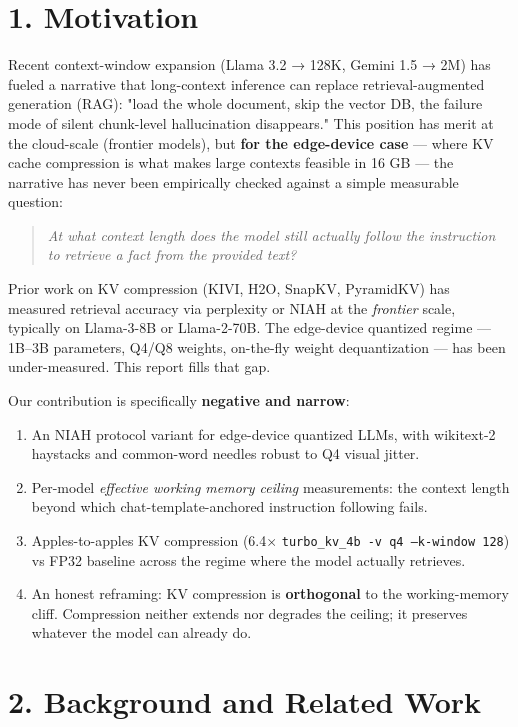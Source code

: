 \documentclass[11pt]{article}
\begin{document}
\section*{1. Motivation}


Recent context-window expansion (Llama 3.2 → 128K, Gemini 1.5 → 2M) has fueled a narrative that long-context inference can replace retrieval-augmented generation (RAG): "load the whole document, skip the vector DB, the failure mode of silent chunk-level hallucination disappears." This position has merit at the cloud-scale (frontier models), but \textbf{for the edge-device case} — where KV cache compression is what makes large contexts feasible in 16 GB — the narrative has never been empirically checked against a simple measurable question:


\begin{quote}
\textit{At what context length does the model still actually follow the instruction to retrieve a fact from the provided text?}
\end{quote}


Prior work on KV compression (KIVI, H2O, SnapKV, PyramidKV) has measured retrieval accuracy via perplexity or NIAH at the \textit{frontier} scale, typically on Llama-3-8B or Llama-2-70B. The edge-device quantized regime — 1B–3B parameters, Q4/Q8 weights, on-the-fly weight dequantization — has been under-measured. This report fills that gap.


Our contribution is specifically \textbf{negative and narrow}:


\begin{enumerate}
\item An NIAH protocol variant for edge-device quantized LLMs, with wikitext-2 haystacks and common-word needles robust to Q4 visual jitter.
\item Per-model \textit{effective working memory ceiling} measurements: the context length beyond which chat-template-anchored instruction following fails.
\item Apples-to-apples KV compression (6.4× \texttt{turbo\_kv\_4b -v q4 --k-window 128}) vs FP32 baseline across the regime where the model actually retrieves.
\item An honest reframing: KV compression is \textbf{orthogonal} to the working-memory cliff. Compression neither extends nor degrades the ceiling; it preserves whatever the model can already do.
\end{enumerate}


\section*{2. Background and Related Work}
\end{document}
